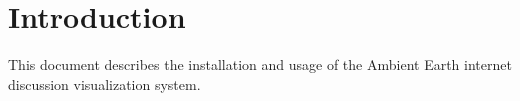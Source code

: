 \chapter{\label{cpt:usage:introduction}Introduction}

This document describes the installation and usage of the Ambient Earth
internet discussion visualization system.
